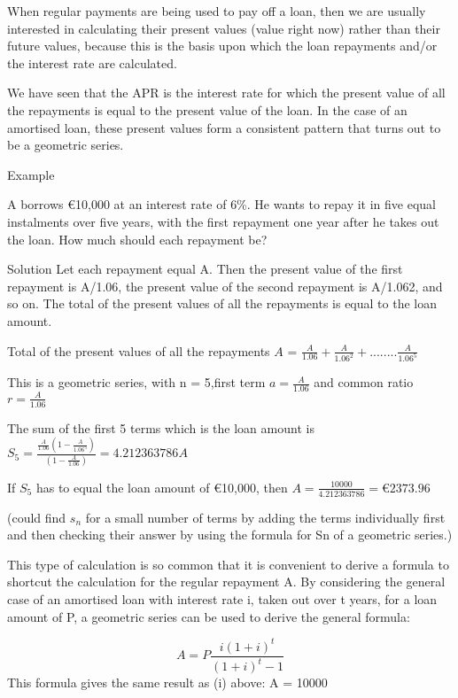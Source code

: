 \documentclass[]{book}
\newcommand{\euro}{€}
\theoremstyle{definition}
\theoremstyle{definition}
\theoremstyle{definition}
\theoremstyle{remark}
\begin{document}
When regular payments are being used to pay off a loan, then we are
usually interested in calculating their present values (value right now)
rather than their future values, because this is the basis upon which
the loan repayments and/or the interest rate are calculated.

We have seen that the APR is the interest rate for which the present
value of all the repayments is equal to the present value of the loan.
In the case of an amortised loan, these present values form a consistent
pattern that turns out to be a geometric series.

Example

A borrows \euro{}10,000 at an interest rate of 6\%. He wants to repay it
in five equal instalments over five years, with the first repayment one
year after he takes out the loan. How much should each repayment be?

Solution Let each repayment equal A. Then the present value of the first
repayment is A/1.06, the present value of the second repayment is
A/1.062, and so on. The total of the present values of all the
repayments is equal to the loan amount.

Total of the present values of all the repayments \(A\) =
\(\frac{A}{1.06} + \frac{A}{1.06^2} + ........ \frac{A}{1.06^5}\)

This is a geometric series, with n = 5,first term \(a=\frac{A}{1.06}\)
and common ratio \(r=\frac{A}{1.06}\)

The sum of the first 5 terms which is the loan amount is
\(S_5= \frac{ \frac{A}{1.06} \left ( 1- \frac{A}{1.06^5} \right ) } { \left ( 1- \frac{A}{1.06} \right )} = 4.212363786A\)

If \(S_5\) has to equal the loan amount of \euro{}10,000, then
\(A = \frac{10 000}{4.212363786} = € 2373.96\)

(could find \(s_{n}\) for a small number of terms by adding the terms
individually first and then checking their answer by using the formula
for Sn of a geometric series.)

This type of calculation is so common that it is convenient to derive a
formula to shortcut the calculation for the regular repayment A. By
considering the general case of an amortised loan with interest rate i,
taken out over t years, for a loan amount of P, a geometric series can
be used to derive the general formula:

\[A= P\frac{i(1+i)^t}{(1+i)^t-1}\] This formula gives the same result as
(i) above: A = 10000
\end{document}
